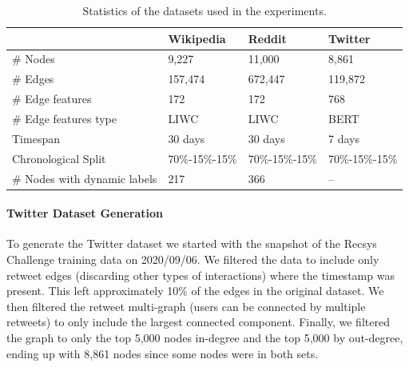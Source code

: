 \documentclass{article}
\begin{document}
    \begin{table}[h]
      \caption{Statistics of the datasets used in the experiments.}
      \label{tab:dataset_statistics}
      \centering
      \begin{tabular}{llll}
        \toprule
                                      & Wikipedia                 & Reddit                  & Twitter                 \\
        \midrule
        \# Nodes                       & 9,227                    & 11,000                   & 8,861                  \\
        \# Edges                       & 157,474                   & 672,447                 & 119,872                \\
        \# Edge features               & 172                       & 172                     & 768                    \\
        \# Edge features type          & LIWC                      & LIWC                    & BERT                   \\
        Timespan                       & 30 days                   & 30 days                 & 7 days                 \\
        Chronological Split            & 70\%-15\%-15\%            & 70\%-15\%-15\%          & 70\%-15\%-15\%         \\
        \# Nodes with dynamic labels   & 217                       & 366                     & --                     \\
        \bottomrule
      \end{tabular}
    \end{table}
 
  \paragraph*{Twitter Dataset Generation} To generate the Twitter dataset we started with the snapshot of the Recsys Challenge training data on 2020/09/06. We filtered the data to include only retweet edges (discarding other types of interactions) where the timestamp was present. This left approximately 10\% of the edges in the original dataset. We then filtered the retweet multi-graph (users can be connected by multiple retweets) to only include the largest connected component. Finally, we filtered the graph to only the top 5,000 nodes in-degree and the top 5,000 by out-degree, ending up with 8,861 nodes since some nodes were in both sets. 
\end{document}
